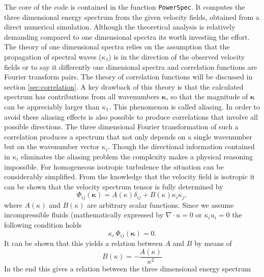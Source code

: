 \documentclass[preprint,12pt,ntfdMod]{elsarticle}
\begin{document}
\begin{par}

The core of the code is contained in the function
\lstinline!PowerSpec!. It computes the three dimensional energy spectrum
from the given velocity fields, obtained from a direct numerical
simulation. Although the theoretical analysis is
relatively demanding compared to one dimensional spectra its worth
investing the effort.
The theory of one dimensional spectra relies
on the assumption that the propagation of spectral waves ($\kappa_1$)
is in the direction of the observed velocity fields or to say it differently one
dimenional spectra and correlation functions are Fourier transform pairs.
The theory of correlation functions will be discussed in section \ref{sec:correlation}.
A key drawback of this theory is that the calculated spectrum has
contributions from all wavenumbers $\boldsymbol\kappa$, so that the
magnitude of $\boldsymbol\kappa$ can be appreciably larger than
$\kappa_1$. This phenomenon is called aliasing.
In order to avoid these aliasing effects is also possible to produce correlations that
involve all possible directions. The three dimensional Fourier
transformation of such a correlation produces a spectrum that not only
depends on a single wavenumber but on the wavenumber vector $\kappa_i$.
Though the directional information contained in $\kappa_i$ eliminates the
aliasing problem the complexity makes a physical reasoning impossible.
For homogeneous isotropic turbulence the situation can be considerably
simplified. From the knowledge that the velocity field is isotropic it can be
shown that the velocity spectrum tensor is fully determined by
  \begin{equation}
      \label{eq:iso_tensor}
      \Phi_{ij}(\boldsymbol\kappa) = A(\kappa)\delta_{ij}+B(\kappa)\kappa_i\kappa_j,
  \end{equation}
where $A(\kappa)$ and $B(\kappa)$ are arbitrary scalar functions. Since we assume
incompressible fluids (mathematically expressed by $\nabla\cdot u=0$ or $\kappa_iu_i=0$
the following condition holds
  \begin{equation}
      \kappa_i\,\Phi_{ij}(\boldsymbol\kappa)=0.
  \end{equation}
It can be shown that this yields a relation between $A$ and $B$ by means of
  \begin{equation}
      \label{eq:rel_AB}
  	B(\kappa)=-\frac{A(\kappa)}{\kappa^2}
  \end{equation}
In the end this gives a relation between the three dimensional energy spectrum

\end{par}
\end{document}
